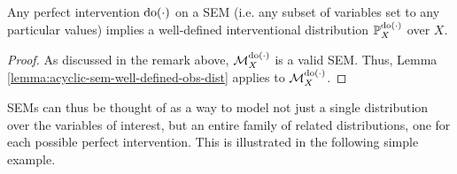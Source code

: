 \medskip

\begin{lemma}\label{lemma:acyclic-sem-well-defined-int-dist}
	Any perfect intervention $\operatorname{do}(\cdot)$ on a SEM (i.e. any subset of variables set to any particular values) implies a well-defined interventional distribution $\mathbb{P}^{\operatorname{do}(\cdot)}_X$ over $X$.
\end{lemma}
\begin{proof}
	As discussed in the remark above, $\mathcal{M}_X^{\operatorname{do}(\cdot)}$ is a valid SEM. Thus, Lemma \ref{lemma:acyclic-sem-well-defined-obs-dist} applies to $\mathcal{M}_X^{\operatorname{do}(\cdot)}$.
\end{proof}
	
SEMs can thus be thought of as a way to model not just a single distribution over the variables of interest, but an entire family of related distributions, one for each possible perfect intervention.
This is illustrated in the following simple example.

